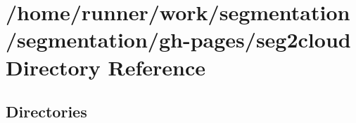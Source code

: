\section{/home/runner/work/segmentation/segmentation/gh-\/pages/seg2cloud Directory Reference}
\label{dir_ff5829e7d78767196f3c6c7d46efb88c}
\subsection*{Directories}
\begin{DoxyCompactItemize}
\end{DoxyCompactItemize}

